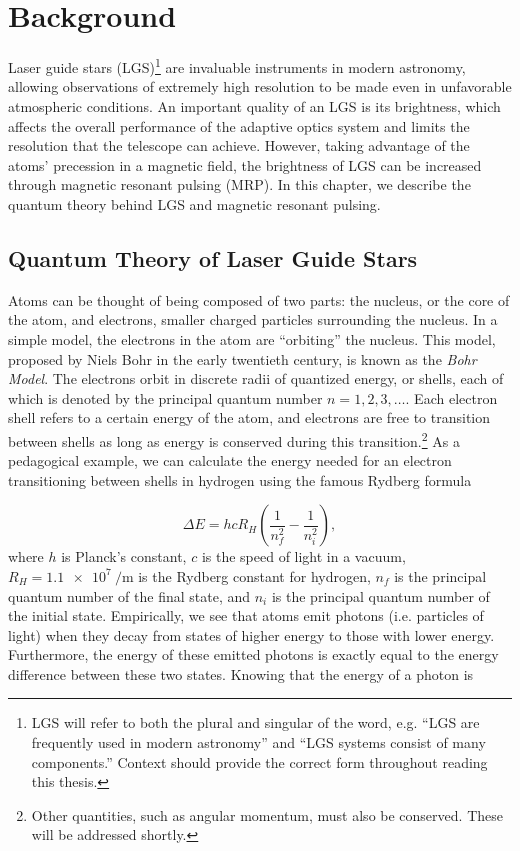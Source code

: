 
\chapter{Background}
Laser guide stars (LGS)\footnote{LGS will refer to both the plural and singular of the word, e.g. ``LGS are frequently used in modern astronomy'' and ``LGS systems consist of many components.'' Context should provide the correct form throughout reading this thesis.}  are invaluable instruments in modern astronomy, allowing observations of extremely high resolution to be made even in unfavorable atmospheric conditions. An important quality of an LGS is its brightness, which affects the overall performance of the adaptive optics system and limits the resolution that the telescope can achieve. However, taking advantage of the atoms' precession in a magnetic field, the brightness of LGS can be increased through magnetic resonant pulsing (MRP). In this chapter, we describe the quantum theory behind LGS and magnetic resonant pulsing.


\section{Quantum Theory of Laser Guide Stars}

Atoms can be thought of being composed of two parts: the nucleus, or the core of the atom, and electrons, smaller charged particles surrounding the nucleus. In a simple model, the electrons in the atom are ``orbiting'' the nucleus. This model, proposed by Niels Bohr in the early twentieth century, is known as the \textit{Bohr Model}. The electrons orbit in discrete radii of quantized energy, or shells, each of which is denoted by the principal quantum number $n = 1,2,3,\dots$. Each electron shell refers to a certain energy of the atom, and electrons are free to transition between shells as long as energy is conserved during this transition.\footnote{Other quantities, such as angular momentum, must also be conserved. These will be addressed shortly.} As a pedagogical example, we can calculate the energy needed for an electron transitioning between shells in hydrogen using the famous Rydberg formula

\begin{equation}
  \Delta E = hc R_H\left( \frac{1}{n_f^2} - \frac{1}{n_i^2}\right),
  \label{rydberg}
\end{equation}
%
where $h$ is Planck's constant, $c$ is the speed of light in a vacuum, $R_H = \SI{1.1e7}{\per\meter}$ is the Rydberg constant for hydrogen, $n_f$ is the principal quantum number of the final state, and $n_i$ is the principal quantum number of the initial state. Empirically, we see that atoms emit photons (i.e. particles of light) when they decay from states of higher energy to those with lower energy. Furthermore, the energy of these emitted photons is exactly equal to the energy difference between these two states. Knowing that the energy of a photon is

